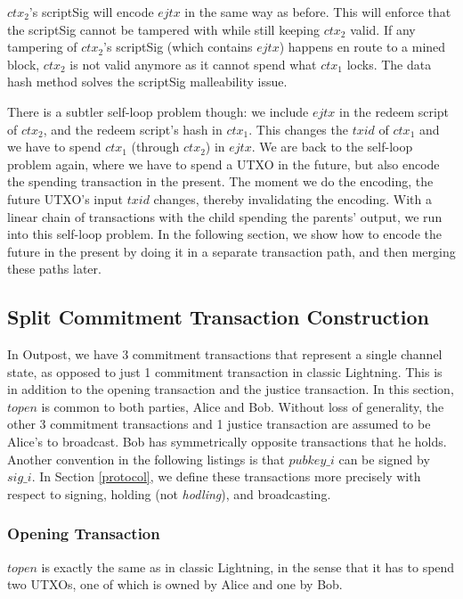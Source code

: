 $\mathit{ctx_2}$'s scriptSig will encode $\mathit{ejtx}$ in the same way as before. This will enforce that the scriptSig cannot be tampered with while still keeping $\mathit{ctx_2}$ valid. If any tampering of $\mathit{ctx_2}$'s scriptSig (which contains $\mathit{ejtx}$) happens en route to a mined block, $\mathit{ctx_2}$ is not valid anymore as it cannot spend what $\mathit{ctx_1}$ locks. The data hash method solves the scriptSig malleability issue. 

There is a subtler self-loop problem though: we include $\mathit{ejtx}$ in the redeem script of $\mathit{ctx_2}$, and the redeem script's hash in $\mathit{ctx_1}$. This changes the $\mathit{txid}$ of $\mathit{ctx_1}$ and we have to spend $\mathit{ctx_1}$ (through $\mathit{ctx_2}$) in $\mathit{ejtx}$. We are back to the self-loop problem again, where we have to spend a UTXO in the future, but also encode the spending transaction in the present. The moment we do the encoding, the future UTXO's input $\mathit{txid}$ changes, thereby invalidating the encoding. With a linear chain of transactions with the child spending the parents' output, we run into this self-loop problem. In the following section, we show how to encode the future in the present by doing it in a separate transaction path, and then merging these paths later.

\subsection{Split Commitment Transaction Construction}
In Outpost, we have 3 commitment transactions that represent a single channel state, as opposed to just 1 commitment transaction in classic Lightning. This is in addition to the opening transaction and the justice transaction. In this section, $\mathit{topen}$ is common to both parties, Alice and Bob. Without loss of generality, the other 3 commitment transactions and 1 justice transaction are assumed to be Alice's to broadcast. Bob has symmetrically opposite transactions that he holds. Another convention in the following listings is that $pubkey\_i$ can be signed by $sig\_i$. In Section \ref{protocol}, we define these transactions more precisely with respect to signing, holding (not \textit{hodling}), and broadcasting.
\subsubsection{Opening Transaction}
$\mathit{topen}$ is exactly the same as in classic Lightning, in the sense that it has to spend two UTXOs, one of which is owned by Alice and one by Bob. 

